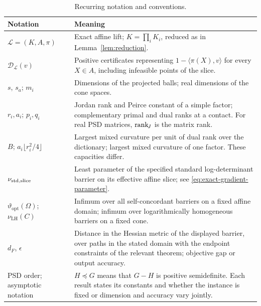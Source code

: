 \begin{table}[htbp]
\centering\small
\caption{Recurring notation and conventions.}\label{tab:notation}
\renewcommand{\arraystretch}{1.12}
\begin{tabular}{@{}>{\raggedright\arraybackslash}p{}>{\raggedright\arraybackslash}p{}@{}}
\toprule
Notation & Meaning\\\midrule
$\mathcal L=(K,A,\pi)$ & Exact affine lift; $K=\prod_iK_i$, reduced as
in Lemma~\ref{lem:reduction}.\\
$\mathcal D_{\mathcal L}(v)$ & Positive certificates representing
$1-\langle\pi(X),v\rangle$ for every $X\in A$,
including infeasible points of the slice.\\
$s$, $s_a$; $m_i$ & Dimensions of the projected balls; real dimensions
of the cone spaces.\\
$r_i,a_i$; $p_i,q_i$ & Jordan rank and Peirce constant of a simple factor;
complementary primal and dual ranks at a contact. For real PSD matrices,
$\operatorname{rank}_{\!J}$ is the matrix rank.\\
$B$; $a_i\lfloor r_i^2/4\rfloor$ & Largest mixed curvature per unit of
dual rank over the dictionary; largest mixed curvature of one factor.
These capacities differ.\\
$\nu_{\mathrm{std},\mathrm{slice}}$ & Least parameter of the specified standard log-determinant
barrier on its effective affine slice; see
\eqref{eq:exact-gradient-parameter}.\\
$\vartheta_{\mathrm{opt}}(\Omega)$;
$\nu_{\mathrm{LH}}(C)$ & Infimum over all self-concordant barriers on a
fixed affine domain; infimum over logarithmically homogeneous
barriers on a fixed cone.\\
$d_F$, $\epsilon$ & Distance in the Hessian metric of the displayed
barrier, over paths in the stated domain with the endpoint constraints of
the relevant theorem; objective gap or output accuracy.\\
PSD order; asymptotic notation & $H\preceq G$ means that $G-H$ is
positive semidefinite. Each result states its constants and whether the
instance is fixed or dimension and accuracy vary jointly.\\
\bottomrule
\end{tabular}
\end{table}
